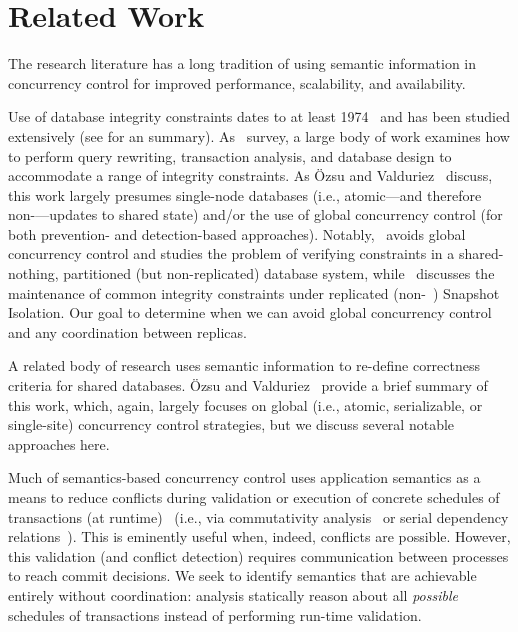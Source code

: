 
\section{Related Work}
\label{sec:relatedwork}

The research literature has a long tradition of using semantic
information in concurrency control for improved performance,
scalability, and availability.


 Use of database integrity constraints
dates to at least 1974~\cite{florentin-constraints} and has been
studied extensively (see \cite{tamer-book} for an
summary). As~\cite{ic-survey,ic-survey-two} survey, a large body of
work examines how to perform query rewriting, transaction analysis,
and database design to accommodate a range of integrity
constraints. As \"{O}zsu and Valduriez~\cite{tamer-book} discuss, this
work largely presumes single-node databases (i.e., atomic---and
therefore non-\cfree---updates to shared state) and/or the use of
global concurrency control (for both prevention- and detection-based
approaches). Notably,~\cite{local-verification} avoids global
concurrency control and studies the problem of verifying constraints
in a shared-nothing, partitioned (but non-replicated) database system,
while~\cite{kemme-si-ic} discusses the maintenance of common integrity
constraints under replicated (non-\cfree~\cite{hat-vldb}) Snapshot
Isolation. Our goal to determine when we can avoid global concurrency
control and any coordination between replicas.


 A related body of
research uses semantic information to re-define correctness criteria
for shared databases. \"{O}zsu and Valduriez~\cite{tamer-book} provide
a brief summary of this work, which, again, largely focuses on global
(i.e., atomic, serializable, or single-site) concurrency control
strategies, but we discuss several notable approaches here.

Much of semantics-based concurrency control uses application semantics
as a means to reduce conflicts during validation or execution of
concrete schedules of transactions (at
runtime)~\cite{badrinath-semantics} (i.e., via commutativity
analysis~\cite{weihl-thesis} or serial dependency
relations~\cite{herlihy-apologizing}). This is eminently useful when,
indeed, conflicts are possible. However, this validation (and conflict
detection) requires communication between processes to reach commit
decisions. We seek to identify semantics that are achievable entirely
without coordination: \iconfluence analysis statically reason about
all \textit{possible} schedules of transactions instead of performing
run-time validation.

